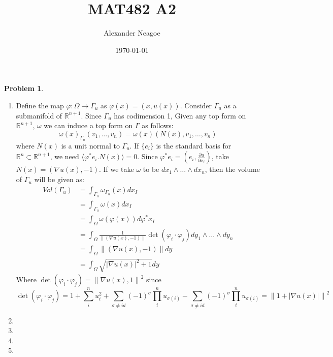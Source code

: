 \documentclass[12pt, a4paper]{article}
\title{MAT482 A2}
\author{Alexander Neagoe}
\date{\today}
\newtheorem{problem}{Problem}
\theoremstyle{definition}
\newcommand{\penum}{ \begin{enumerate}[label=\bf(\alph*), leftmargin=0pt]}
\newcommand{\epenum}{ \end{enumerate} }
\newcommand{\R}{\mathbb{R}}                           %
\newcommand{\grad}{\nabla}
\newcommand{\lan}{\langle}
\newcommand{\ran}{\rangle}
\newcommand{\norm}[1]{\left\lVert#1\right\rVert}
\newcommand{\inn}[1]{\lan#1\ran}
\begin{document}
\maketitle

\begin{problem}
\end{problem}
\penum
\item Define the map $\varphi : \Omega \to \Gamma_u$ as $\varphi(x) = (x,u(x))$. Consider $\Gamma_u$ as a submanifold of $\R^{n+1}$. Since $\Gamma_u$ has codimension 1, Given any top form on $\R^{n+1}$, $\omega$ we can induce a top form on $\Gamma$ as follows: 
$$\omega(x)_{\Gamma_u} (v_1, \dots , v_n) = \omega(x)(N(x) , v_1 , \dots , v_n)$$
where $N(x)$ is a unit normal to $\Gamma_u$. If $\{e_i\}$ is the standard basis for $\R^n \subset\R^{n+1}$, we need $ \inn{\varphi^\ast e_i. N(x) } = 0$. Since $\varphi^\ast e_i = \left(e_i, \frac{\partial u}{\partial x_i} \right)$, take $N(x) = (\grad u(x), -1)$.
If we take $\omega$ to be $dx_1 \wedge \dots \wedge dx_{n}$, then the volume of $\Gamma_u$ will be given as: 
\begin{align*}
Vol(\Gamma_u) &= \int_{\Gamma_u} \omega_{\Gamma_u}(x) dx_{I} 
\\ &= \int_{\Gamma_u} \omega(x)dx_I 
\\ &= \int_\Omega \omega(\varphi(x))d \varphi^\ast x_I  
\\& = \int_\Omega \frac{1}{\norm{(\grad u(x) , -1)}} \det ( \varphi_i \cdot \varphi_j ) dy_1 \wedge \dots  \wedge dy_n 
\\ & = \int_\Omega \norm{(\grad u(x), -1)} dy
\\ & = \int_\Omega \sqrt{|\grad u (x) |^2 + 1} dy
\end{align*} 
Where $\det ( \varphi_i \cdot \varphi_j ) = \norm{\grad u(x), 1}^2$ since 
$$\det ( \varphi_i \cdot \varphi_j ) = 1 + \sum_i^n u_i^2 + \sum_{\sigma \neq id} (-1)^\sigma \prod_{i}^{n} u_{\sigma(i)} - \sum_{\sigma \neq id} (-1)^\sigma \prod_{i}^{n} u_{\sigma(i)} = \norm{1+ |\grad u(x)|}^2 $$
\item
\item 
\item 
\item 
\epenum
\end{document}
